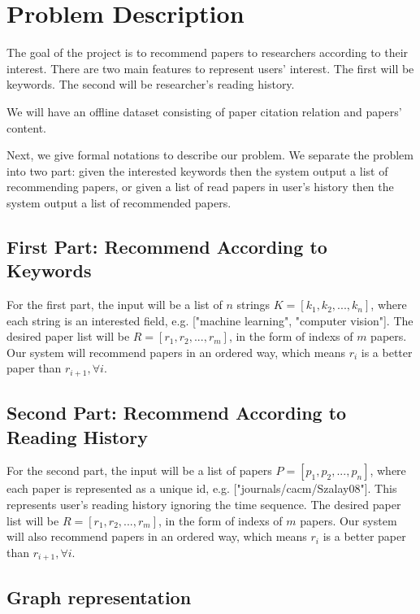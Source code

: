 \section{Problem Description}

The goal of the project is to recommend papers to researchers according to their interest. There are two main features to represent users' interest. The first will be keywords. The second will be researcher's reading history.  

We will have an offline dataset consisting of paper citation relation and papers' content.

Next, we give formal notations to describe our problem. We separate the problem into two part: given the interested keywords then the system output a list of recommending papers, or given a list of read papers in user's history then the system output a list of recommended papers. 

\subsection{First Part: Recommend According to Keywords}

For the first part, the input will be a list of $n$ strings $K = [k_1, k_2, ..., k_n]$, where each string is an interested field, e.g. ["machine learning", "computer vision"]. The desired paper list will be $R = [r_1, r_2, ..., r_m]$, in the form of indexs of $m$ papers. Our system will recommend papers in an ordered way, which means $r_i$ is a better paper than $r_{i+1}, \forall i$.

\subsection{Second Part: Recommend According to Reading History}

For the second part, the input will be a list of papers $P = [p_1, p_2, ..., p_n]$, where each paper is represented as a unique id, e.g. ["journals/cacm/Szalay08"]. This represents user's reading history ignoring the time sequence. The desired paper list will be $R =  [r_1, r_2, ..., r_m]$, in the form of indexs of $m$ papers. Our system will also recommend papers in an ordered way, which means $r_i$ is a better paper than $r_{i+1}, \forall i$.

\subsection{Graph representation}

